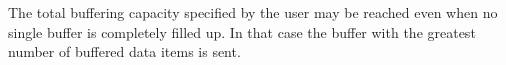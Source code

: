The total buffering capacity specified by the user may be reached even
when no single buffer is completely filled up. In that case the buffer
with the greatest number of buffered data items is sent.







